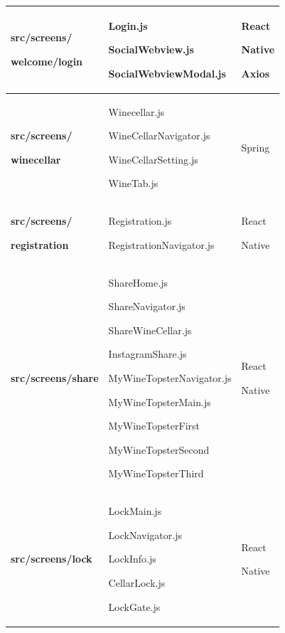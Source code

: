 \documentclass[sigconf, nonacm]{acmart}
\begin{document}
\begin {enumerate}
\begin{table}[ht!]
\begin{center}
\begin{tabular}{|p{2.7cm}|p{3.4cm}|p{1.3cm}|}
        \textbf{src/screens/} \par \textbf{welcome/login} & Login.js
        
        SocialWebview.js
        
        SocialWebviewModal.js & React \par Native
        
        Axios\\
        \hline
        
        \textbf{src/screens/} \par \textbf{winecellar} & Winecellar.js
         
        WineCellarNavigator.js
         
        WineCellarSetting.js 
        
        WineTab.js & Spring\\
        \hline
        
        \textbf{src/screens/} \par \textbf{registration} & Registration.js
        
        RegistrationNavigator.js & React \par Native\\
        \hline
         
        \textbf{src/screens/share} & ShareHome.js
        
        ShareNavigator.js
        
        ShareWineCellar.js 
        
        InstagramShare.js
        
        MyWineTopsterNavigator.js
        
        MyWineTopsterMain.js
        
        MyWineTopsterFirst
        
        MyWineTopsterSecond
        
        MyWineTopsterThird & React \par Native\\
        \hline
        
        \textbf{src/screens/lock} & LockMain.js
        
        LockNavigator.js
        
        LockInfo.js
        
        CellarLock.js 
        
        LockGate.js & React \par Native\\
        \hline
        

\end{tabular}
\end{center}
\end{table}
\end{enumerate}
\end{document}
